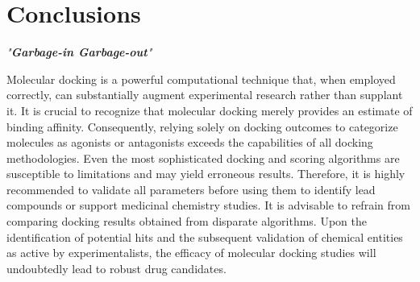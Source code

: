\chapter*{Conclusions}

\textit{"\textbf{Garbage-in Garbage-out}"}

Molecular docking is a powerful computational technique that, when employed correctly, can substantially augment experimental research rather than supplant it. It is crucial to recognize that molecular docking merely provides an estimate of binding affinity. Consequently, relying solely on docking outcomes to categorize molecules as agonists or antagonists exceeds the capabilities of all docking methodologies. Even the most sophisticated docking and scoring algorithms are susceptible to limitations and may yield erroneous results. Therefore, it is highly recommended to validate all parameters before using them to identify lead compounds or support medicinal chemistry studies. It is advisable to refrain from comparing docking results obtained from disparate algorithms. Upon the identification of potential hits and the subsequent validation of chemical entities as active by experimentalists, the efficacy of molecular docking studies will undoubtedly lead to robust drug candidates.
